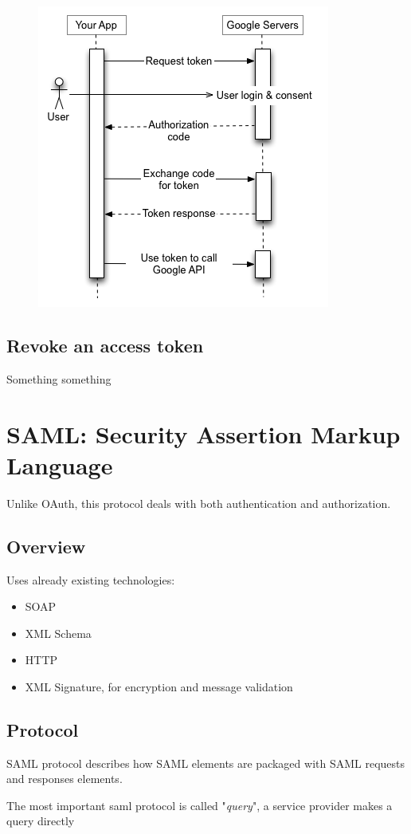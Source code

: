 \documentclass{style}
\begin{document}
\begin{figure}[h]
    \centering
    \includegraphics[width=.5\textwidth]{img/authorization-code.png}
\end{figure}
\subsection{Revoke an access token}
Something something

\section{SAML: Security Assertion Markup Language}
Unlike OAuth, this protocol deals with both authentication and
authorization.

\subsection{Overview}
Uses already existing technologies:
\begin{itemize}
    \item SOAP
    \item XML Schema
    \item HTTP
    \item XML Signature, for encryption and message validation
\end{itemize}

\subsection{Protocol}
SAML protocol describes how SAML elements are packaged with SAML requests
and responses elements.

The most important saml protocol is called "\textit{query}", a service provider
makes a query directly
\end{document}
